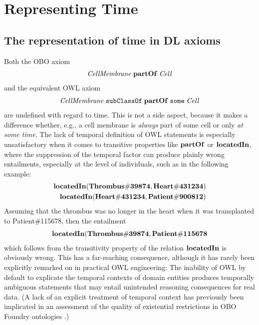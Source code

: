 \section*{Representing Time}

\subsection*{The representation of time in DL axioms}

Both the OBO axiom
%
\begin{equation}
\begin{split}
\mathit{CellMembrane}\;\mathrm{\mathbf{partOf}}\;\mathit{Cell}
\end{split}
\label{eq:cellobo}
\end{equation}  
%
and the equivalent OWL axiom
%
\begin{equation}
\begin{split}
\mathit{CellMembrane}\;\mathtt{subClassOf}\;\mathrm{\mathbf{partOf}}\;\mathtt{some}\;\mathit{Cell}
\end{split}
\label{eq:celldl}
\end{equation}  
%
are undefined with regard to time. This is not a side aspect, because it makes a
difference whether, e.g., a cell membrane is \emph{always} part of some cell or
only \emph{at some time}.
The lack of temporal definition of OWL statements is especially unsatisfactory
when it comes to transitive properties like $\mathrm{\mathbf{partOf}}$ or $\mathrm{\mathbf{locatedIn}}$,
where the suppression of the temporal factor can produce plainly wrong entailments,
especially at the level of individuals, such as in the following example:
%
\begin{equation}
\begin{split}
\mathrm{\mathbf{locatedIn}} (\mathrm{\mathbf{Thrombus\#39874}}, \mathrm{\mathbf{Heart\#431234}})  \\
\mathrm{\mathbf{locatedIn}} (\mathrm{\mathbf{Heart\#431234}}, \mathrm{\mathbf{Patient\#900812}})
\end{split}
\label{eq:trans}
\end{equation}
%
Assuming that the thrombus was no longer in the heart when it was transplanted to Patient\#115678, then the entailment
%
\begin{equation}
\begin{split}
\mathrm{\mathbf{locatedIn}} (\mathrm{\mathbf{Thrombus\#39874}}, \mathrm{\mathbf{Patient\#115678}}
\end{split}
\label{eq:transEntailment}
\end{equation}
%
which follows from the transitivity property of the relation $\mathrm{\mathbf{locatedIn}}$ is obviously wrong.
This has a far-reaching consequence, although it has rarely been explicitly remarked on in practical OWL engineering:
The inability of OWL by default to explicate the temporal contexts of domain 
entities produces temporally ambiguous statements that may entail unintended reasoning consequences for real data. (A lack of an explicit treatment of temporal context has previously been implicated in an assessment of the quality of existential restrictions in OBO Foundry ontologies \cite{boeker2011}.)

